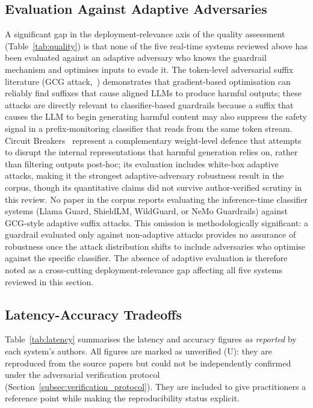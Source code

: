 \subsection{Evaluation Against Adaptive Adversaries}

A significant gap in the deployment-relevance axis of the quality assessment
(Table~\ref{tab:quality}) is that none of the five real-time systems reviewed above
has been evaluated against an adaptive adversary who knows the guardrail mechanism
and optimises inputs to evade it.
The token-level adversarial suffix literature (GCG attack,~\cite{zou2023universal})
demonstrates that gradient-based optimisation can reliably find suffixes that cause
aligned LLMs to produce harmful outputs; these attacks are directly relevant to
classifier-based guardrails because a suffix that causes the LLM to begin generating
harmful content may also suppress the safety signal in a prefix-monitoring classifier
that reads from the same token stream.
Circuit Breakers~\cite{zou2024improving} represent a complementary weight-level
defence that attempts to disrupt the internal representations that harmful generation
relies on, rather than filtering outputs post-hoc; its evaluation includes white-box
adaptive attacks, making it the strongest adaptive-adversary robustness result in the
corpus, though its quantitative claims did not survive author-verified scrutiny in
this review.
No paper in the corpus reports evaluating the inference-time classifier systems
(Llama Guard, ShieldLM, WildGuard, or NeMo Guardrails) against GCG-style adaptive
suffix attacks.
This omission is methodologically significant: a guardrail evaluated only against
non-adaptive attacks provides no assurance of robustness once the attack distribution
shifts to include adversaries who optimise against the specific classifier.
The absence of adaptive evaluation is therefore noted as a cross-cutting
deployment-relevance gap affecting all five systems reviewed in this section.

\subsection{Latency-Accuracy Tradeoffs}

Table~\ref{tab:latency} summarises the latency and accuracy figures \emph{as
reported} by each system's authors.
All figures are marked as unverified (U): they are reproduced from the source
papers but could not be independently confirmed under the adversarial verification
protocol (Section~\ref{subsec:verification_protocol}).
They are included to give practitioners a reference point while making the
reproducibility status explicit.

